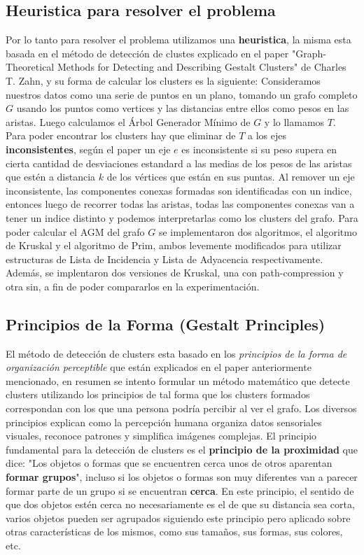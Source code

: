 \documentclass[8pt,a4paper]{article}
\begin{document}
\subsection{Heuristica para resolver el problema}

Por lo tanto para resolver el problema utilizamos una \textbf{heuristica}, la misma esta basada en el método de detección de clustes explicado en el paper "Graph-Theoretical Methods for Detecting and Describing Gestalt Clusters" de Charles T. Zahn, y su forma de calcular los clusters es la siguiente: Consideramos nuestros datos como una serie de puntos en un plano, tomando un grafo completo $G$ usando los puntos como vertices y las distancias entre ellos como pesos en las aristas. Luego calculamos el Árbol Generador Mínimo de $G$ y lo llamamos $T$.
Para poder encontrar los clusters hay que eliminar de $T$ a los ejes \textbf{inconsistentes}, según el paper un eje $e$ es inconsistente si su peso supera en cierta cantidad de desviaciones estandard a las medias de los pesos de las aristas que estén a distancia $k$ de los vértices que están en sus puntas. Al remover un eje inconsistente, las componentes conexas formadas son identificadas con un indice, entonces luego de recorrer todas las aristas, todas las componentes conexas van a tener un  indice distinto y podemos interpretarlas como los clusters del grafo.
Para poder calcular el AGM del grafo $G$ se implementaron dos algoritmos, el algoritmo de Kruskal y el algoritmo de Prim, ambos levemente modificados para utilizar estructuras de Lista de Incidencia y Lista de Adyacencia respectivamente. Además, se implentaron dos versiones de Kruskal, una con path-compression y otra sin, a fin de poder compararlos en la experimentación.

\subsection{Principios de la Forma (Gestalt Principles)}

El método de detección de clusters esta basado en los \textit{principios de la forma de organización perceptible} que están explicados en el paper anteriormente mencionado, en resumen se intento formular un método matemático que detecte clusters utilizando los principios de tal forma que los clusters formados correspondan con los que una persona podría percibir al ver el grafo.
Los diversos principios explican como la percepción humana organiza datos sensoriales visuales, reconoce patrones y simplifica imágenes complejas. El principio fundamental para la detección de clusters es el \textbf{principio de la proximidad} que dice: "Los objetos o formas que se encuentren cerca unos de otros aparentan \textbf{formar grupos}", incluso si los objetos o formas son muy diferentes van a parecer formar parte de un grupo si se encuentran \textbf{cerca}. En este principio, el sentido de que dos objetos estén cerca no necesariamente es el de que su distancia sea corta, varios objetos pueden ser agrupados siguiendo este principio pero aplicado sobre otras características de los mismos, como sus tamaños, sus formas, sus colores, etc.
\end{document}
